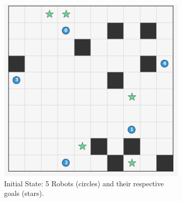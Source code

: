 \begin{figure}[htbp]
    \centering
    \begin{subfigure}[b]{0.32\textwidth}
        \centering
        \includegraphics[width=\textwidth]{images/case_study_initial_state.png} %
        \caption{Initial State: 5 Robots (circles) and their respective goals (stars).}
        \label{fig:cs_initial}
    \end{subfigure}
    \hfill %
    \begin{subfigure}[b]{0.32\textwidth}
        \centering

\end{subfigure}
\end{figure}
